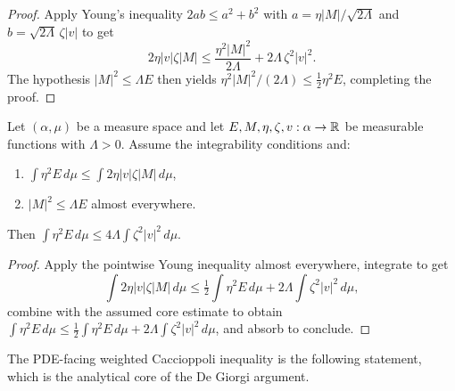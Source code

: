\begin{proof}
\leanok

Apply Young's inequality $2ab \le a^2 + b^2$ with $a =
\eta |M| / \sqrt{2\Lambda}$ and $b = \sqrt{2\Lambda}\, \zeta |v|$ to
get
\begin{equation*}
  2 \eta |v| \zeta |M|
   \le \frac{\eta^2 |M|^2}{2\Lambda} + 2\Lambda\, \zeta^2 |v|^2.
\end{equation*}
The hypothesis $|M|^2 \le \Lambda E$ then yields $\eta^2 |M|^2 /
(2\Lambda) \le \tfrac{1}{2} \eta^2 E$, completing the proof.
\end{proof}

\begin{theorem}
\label{thm:weighted_caccioppoli_absorb}
\leanok
Let $(\alpha, \mu)$ be a measure space and let $E, M, \eta, \zeta, v
: \alpha \to \mathbb{R}$ be measurable functions with $\Lambda > 0$. Assume
the integrability conditions and:
\begin{enumerate}
\item $\int \eta^2 E \, d\mu \le \int 2 \eta |v| \zeta |M| \, d\mu$,
\item $|M|^2 \le \Lambda E$ almost everywhere.
\end{enumerate}
Then $\int \eta^2 E \, d\mu \le 4 \Lambda \int \zeta^2 |v|^2 \, d\mu$.
\end{theorem}

\begin{proof}
\leanok
{}

Apply the pointwise Young inequality almost everywhere, integrate to
get
\begin{equation*}
  \int 2\eta|v|\zeta|M|\, d\mu
   \le \tfrac{1}{2}\int \eta^2 E\, d\mu
        + 2\Lambda \int \zeta^2 |v|^2 \, d\mu,
\end{equation*}
combine with the assumed core estimate to obtain
$\int \eta^2 E\, d\mu \le \tfrac12 \int \eta^2 E\, d\mu + 2\Lambda
\int \zeta^2 |v|^2 \, d\mu$, and absorb to conclude.
\end{proof}

The PDE-facing weighted Caccioppoli inequality is the following
statement, which is the analytical core of the De Giorgi argument.


